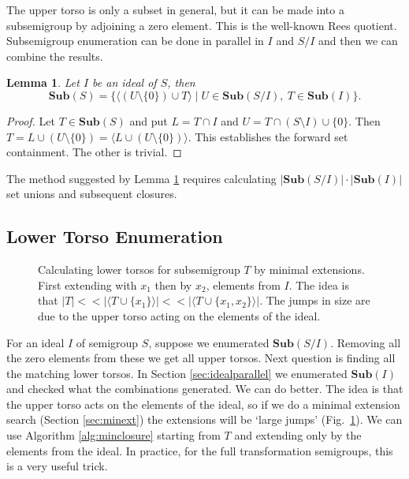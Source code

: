 \documentclass{amsart}
\newcommand{\Sub}{\mathbf{Sub}}
\theoremstyle{plain}
\newtheorem{lemma}[theorem]{Lemma}
\theoremstyle{definition}
\begin{document}
The upper torso is only a subset in general, but it can be made into a subsemigroup by adjoining a zero element. This is the well-known Rees quotient. 
Subsemigroup enumeration can be done in parallel in $I$ and $S/I$  and then  we can combine the results.

\begin{lemma}
\label{lem:torso}
Let $I$ be an ideal of $S$, then $$\Sub(S)=\big\{\langle (U\setminus\{0\})\cup T \rangle\mid U\in \Sub(S/I),\ T\in\Sub(I)\big\}.$$
\end{lemma}
\begin{proof}
Let $T\in\Sub(S)$ and put $L=T\cap I$ and $U=T\cap(S\setminus I)\cup\{0\}$. Then $T=L\cup(U\setminus \{0\})=\langle L\cup(U\setminus\{0\})\rangle$. This establishes the forward set containment. The other is trivial.
\end{proof}



The method suggested by Lemma \ref{lem:torso} requires calculating $|\Sub(S/I)|\cdot|\Sub(I)|$ set unions and subsequent closures. 
\subsection{Lower Torso Enumeration}
\label{sec:lowertorso}
\begin{figure}

\caption{Calculating lower torsos for subsemigroup $T$ by minimal extensions. First extending with $x_1$ then by $x_2$, elements from $I$. The idea is that $|T| << |\langle T\cup\{x_1\}\rangle| << |\langle T\cup\{x_1,x_2\}\rangle|$. The jumps in size are due to the upper torso acting on the elements of the ideal.}
\label{fig:lowertorsoenum}
\end{figure}
For an ideal $I$ of semigroup $S$, suppose we enumerated $\Sub(S/I)$.
Removing all the zero elements from these we get all upper torsos.
Next question is finding all the matching lower torsos.
In Section \ref{sec:idealparallel} we enumerated $\Sub(I)$ and checked what the combinations generated.
We can do better.
The idea is that the upper torso acts on the elements of the ideal, so if we do a minimal extension search (Section \ref{sec:minext}) the extensions will be `large jumps' (Fig.~\ref{fig:lowertorsoenum}).
We can use Algorithm \ref{alg:minclosure} starting from $T$ and extending only by the elements from the ideal. %
In practice, for the full transformation semigroups, this is a very useful trick.
\end{document}

